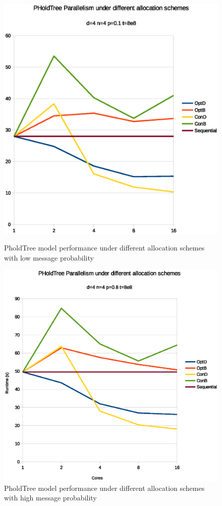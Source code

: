 \begin{figure}
    \center

    \includegraphics[width=\modelfraction\columnwidth]{fig/pholdtreealloclowp.eps}
    \caption{PholdTree model performance under different allocation schemes with low message probability}
    \label{fig:PholdTree_plot_alloc_low}

    \includegraphics[width=\modelfraction\columnwidth]{fig/pholdtreeallochighp.eps}
    \caption{PholdTree model performance under different allocation schemes with high message probability}
    \label{fig:PholdTree_plot_alloc_high}
\end{figure}

